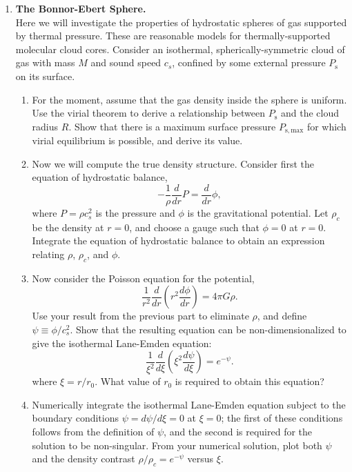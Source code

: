 \problemset

\begin{enumerate}

\item \textbf{The Bonnor-Ebert Sphere.}\\
Here we will investigate the properties of hydrostatic spheres of gas supported by thermal pressure. These are reasonable models for thermally-supported molecular cloud cores. Consider an isothermal, spherically-symmetric cloud of gas with mass $M$ and sound speed $c_s$, confined by some external pressure $P_{\mathrm{s}}$ on its surface.
\begin{enumerate}
\item For the moment, assume that the gas density inside the sphere is uniform. Use the virial theorem to derive a relationship between $P_{\mathrm{s}}$ and the cloud radius $R$. Show that there is a maximum surface pressure $P_{\mathrm{s,max}}$ for which virial equilibrium is possible, and derive its value.
\item Now we will compute the true density structure. Consider first the equation of hydrostatic balance,
\begin{displaymath}
-\frac{1}{\rho}\frac{d}{dr} P = \frac{d}{dr} \phi,
\end{displaymath}
where $P = \rho c_s^2$ is the pressure and $\phi$ is the gravitational potential. Let $\rho_c$ be the density at $r=0$, and choose a gauge such that $\phi = 0$ at $r=0$. Integrate the equation of hydrostatic balance to obtain an expression relating $\rho$, $\rho_c$, and $\phi$.
\item Now consider the Poisson equation for the potential,
\begin{displaymath}
\frac{1}{r^2}\frac{d}{dr}\left(r^2 \frac{d\phi}{dr}\right) = 4 \pi G \rho.
\end{displaymath}
Use your result from the previous part to eliminate $\rho$, and define $\psi \equiv \phi/c_s^2$. Show that the resulting equation can be non-dimensionalized to give the isothermal Lane-Emden equation:
\begin{displaymath}
\frac{1}{\xi^2}\frac{d}{d\xi}\left(\xi^2 \frac{d\psi}{d\xi}\right) = e^{-\psi}.
\end{displaymath}
where $\xi = r/r_0$. What value of $r_0$ is required to obtain this equation?
\item Numerically integrate the isothermal Lane-Emden equation subject to the boundary conditions $\psi=d\psi/d\xi = 0$ at $\xi=0$; the first of these conditions follows from the definition of $\psi$, and the second is required for the solution to be non-singular. From your numerical solution, plot both $\psi$ and the density contrast $\rho/\rho_c = e^{-\psi}$ versus $\xi$.

\end{enumerate}
\end{enumerate}
